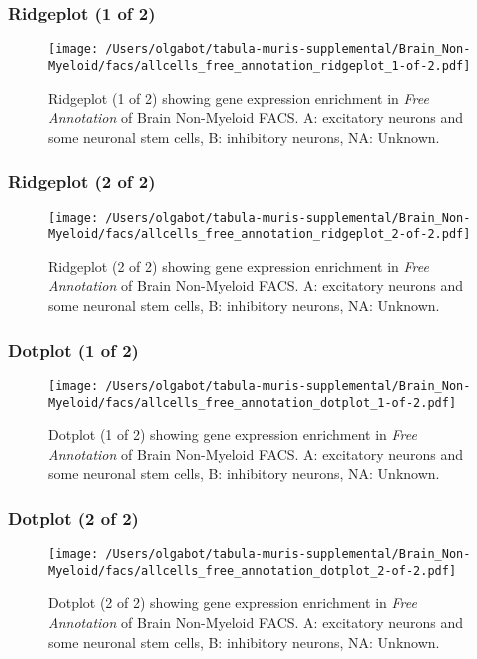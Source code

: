 \clearpage

\subsubsection{Ridgeplot (1 of 2)}
\begin{figure}[h]
\centering
\texttt{[image: /Users/olgabot/tabula-muris-supplemental/Brain\_Non-Myeloid/facs/allcells\_free\_annotation\_ridgeplot\_1-of-2.pdf]}

\caption{ Ridgeplot (1 of 2)  showing gene expression enrichment in \emph{Free Annotation} of Brain Non-Myeloid FACS. A: excitatory neurons and some neuronal stem cells, B: inhibitory neurons, NA: Unknown.}
\end{figure}


\clearpage

\subsubsection{Ridgeplot (2 of 2)}
\begin{figure}[h]
\centering
\texttt{[image: /Users/olgabot/tabula-muris-supplemental/Brain\_Non-Myeloid/facs/allcells\_free\_annotation\_ridgeplot\_2-of-2.pdf]}

\caption{ Ridgeplot (2 of 2)  showing gene expression enrichment in \emph{Free Annotation} of Brain Non-Myeloid FACS. A: excitatory neurons and some neuronal stem cells, B: inhibitory neurons, NA: Unknown.}
\end{figure}


\clearpage

\subsubsection{Dotplot (1 of 2)}
\begin{figure}[h]
\centering
\texttt{[image: /Users/olgabot/tabula-muris-supplemental/Brain\_Non-Myeloid/facs/allcells\_free\_annotation\_dotplot\_1-of-2.pdf]}

\caption{ Dotplot (1 of 2)  showing gene expression enrichment in \emph{Free Annotation} of Brain Non-Myeloid FACS. A: excitatory neurons and some neuronal stem cells, B: inhibitory neurons, NA: Unknown.}
\end{figure}


\clearpage

\subsubsection{Dotplot (2 of 2)}
\begin{figure}[h]
\centering
\texttt{[image: /Users/olgabot/tabula-muris-supplemental/Brain\_Non-Myeloid/facs/allcells\_free\_annotation\_dotplot\_2-of-2.pdf]}

\caption{ Dotplot (2 of 2)  showing gene expression enrichment in \emph{Free Annotation} of Brain Non-Myeloid FACS. A: excitatory neurons and some neuronal stem cells, B: inhibitory neurons, NA: Unknown.}
\end{figure}


